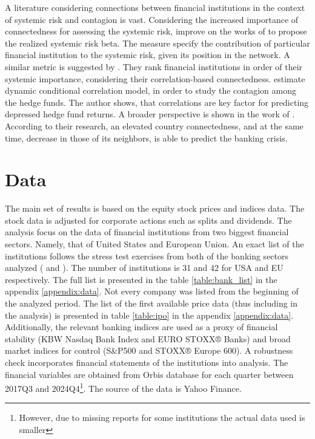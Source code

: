 \documentclass[12pt]{article}
\begin{document}
A literature considering connections between financial institutions in the context of systemic risk and contagion is vast. Considering the increased importance of connectedness for assessing the systemic risk, \cite{hautsch14} improve on the works of \cite{adrian16} to propose the realized systemic risk beta. The measure specify the contribution of particular financial institution to the systemic risk, given its position in the network. A similar metric is suggested by \cite{dungey12}. They rank financial institutions in order of their systemic importance, considering their correlation-based connectedness. \cite{savona14} estimate dynamic conditional correlation model, in order to study the contagion among the hedge funds. The author shows, that correlations are key factor for predicting depressed hedge fund returns. A broader perspective is shown in the work of \cite{minoiu15}. According to their research, an elevated country connectedness, and at the same time, decrease in those of its neighbors, is able to predict the banking crisis.

\section{Data}\label{section:Data}

The main set of results is based on the equity stock prices and indices data. The stock data is adjusted for corporate actions such as splits and dividends. The analysis focus on the data of financial institutions from two biggest financial sectors. Namely, that of United States and European Union. An exact list of the institutions follows the stress test exercises from both of the banking sectors analyzed (\cite{eba2021} and \cite{fed21}). The number of institutions is 31 and 42 for USA and EU respectively. The full list is presented in the table \ref{table:bank_list} in the appendix \ref{appendix:data}. Not every company was listed from the beginning of the analyzed period. The list of the first available price data (thus including in the analysis) is presented in table \ref{table:ipo} in the appendix \ref{appendix:data}. Additionally, the relevant banking indices are used as a proxy of financial stability (KBW Nasdaq Bank Index and EURO STOXX® Banks) and broad market indices for control (S\&P500 and STOXX® Europe 600). A robustness check incorporates financial statements of the institutions into analysis. The financial variables are obtained from Orbis database for each quarter between 2017Q3 and 2024Q4\footnote{However, due to missing reports for some institutions the actual data used is smaller}. The source of the data is Yahoo Finance. 
\end{document}
